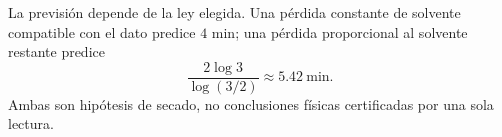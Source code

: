 La previsión depende de la ley elegida. Una pérdida constante de solvente compatible con el dato predice \(4\) min; una pérdida proporcional al solvente restante predice
\[
\frac{2\log3}{\log(3/2)}\approx5.42\ \mathrm{min}.
\]
Ambas son hipótesis de secado, no conclusiones físicas certificadas por una sola lectura.
